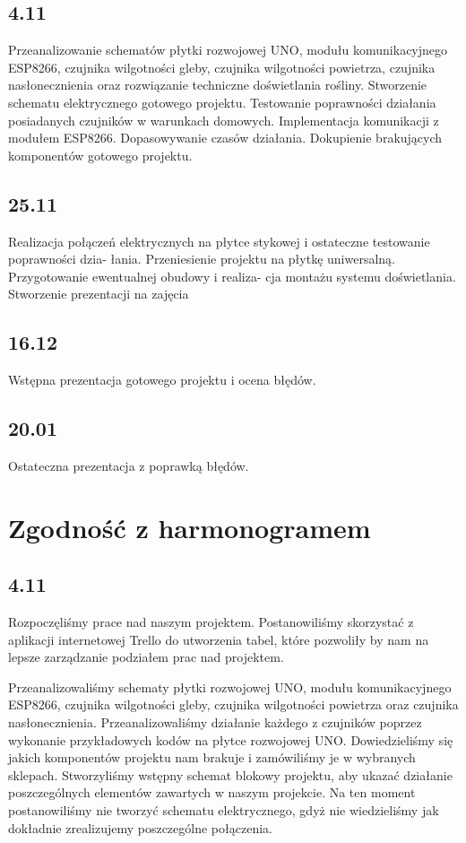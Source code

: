 \documentclass[12pt]{article}
\begin{document}
\subsection{4.11}
Przeanalizowanie schematów płytki rozwojowej UNO, modułu komunikacyjnego ESP8266, czujnika wilgotności gleby, czujnika wilgotności powietrza, czujnika nasłonecznienia oraz rozwiązanie techniczne doświetlania rośliny. Stworzenie schematu elektrycznego gotowego projektu. Testowanie poprawności działania posiadanych czujników w warunkach domowych. Implementacja komunikacji z modułem ESP8266. Dopasowywanie czasów działania. 
Dokupienie brakujących komponentów gotowego projektu. 
\subsection{25.11}
Realizacja połączeń elektrycznych na płytce stykowej i ostateczne testowanie poprawności dzia-
łania. Przeniesienie projektu na płytkę uniwersalną. Przygotowanie ewentualnej obudowy i realiza-
cja montażu systemu doświetlania. Stworzenie prezentacji na zajęcia

\subsection{16.12}
Wstępna prezentacja gotowego projektu i ocena błędów.

\subsection{20.01}
Ostateczna prezentacja z poprawką błędów.



\section{Zgodność z harmonogramem}
\subsection{4.11}
Rozpoczęliśmy prace nad naszym projektem. Postanowiliśmy skorzystać z aplikacji internetowej Trello do utworzenia tabel, które pozwoliły by nam na lepsze zarządzanie podziałem prac nad projektem.

Przeanalizowaliśmy schematy płytki rozwojowej UNO, modułu komunikacyjnego ESP8266, czujnika wilgotności gleby, czujnika wilgotności powietrza oraz czujnika nasłonecznienia. Przeanalizowaliśmy działanie każdego z czujników poprzez wykonanie przykładowych kodów na płytce rozwojowej UNO. Dowiedzieliśmy się jakich komponentów projektu nam brakuje i zamówiliśmy je w wybranych sklepach.
Stworzyliśmy wstępny schemat blokowy projektu, aby ukazać działanie poszczególnych elementów zawartych w naszym projekcie. Na ten moment postanowiliśmy nie tworzyć schematu elektrycznego, gdyż nie wiedzieliśmy jak dokładnie zrealizujemy poszczególne połączenia.
\end{document}
